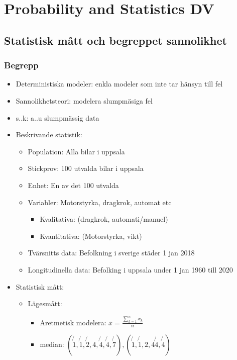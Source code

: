 \chapter{Probability and Statistics DV}

\newpage

\begin{multicols}{2}
\section{Statistisk mått och begreppet sannolikhet}
\subsection{Begrepp}
\begin{itemize}
    \item Deterministiska modeler: enkla modeler som inte tar hänsyn till fel
    \item Sannolikhetsteori: modelera slumpmäsiga fel
    \item s..k: a..u slumpmässig data
    \item Beskrivande statistik:
    \begin{itemize}
        \item Population: Alla bilar i uppsala
        \item Stickprov: 100 utvalda bilar i uppsala
        \item Enhet: En av det 100 utvalda
        \item Variabler: Motorstyrka, dragkrok, automat etc
        \begin{itemize}
          \item Kvalitativa: (dragkrok, automati/manuel)
          \item Kvantitativa: (Motorstyrka, vikt)
        \end{itemize}
        \item Tvärsnitts data: Befolkning i sverige städer 1 jan 2018
        \item Longitudinella data: Befolking i uppsala under 1 jan 1960 till 2020
    \end{itemize}
    \item Statistisk mått:
    \begin{itemize}
        \item Lägesmått:
        \begin{itemize}
          \item Aretmetisk modelera: $ \overline{x} = \frac{\sum_{k=1}^{n} x_k}{n} $
          \item median: $(\not{1}, \not{1}, \not{2}, 4, \not{4}, \not{4}, \not{7}), (\not{1}, \not{1}, 2, 4 \not{4}, \not{4})$

\end{itemize}
\end{itemize}
\end{itemize}
\end{multicols}

